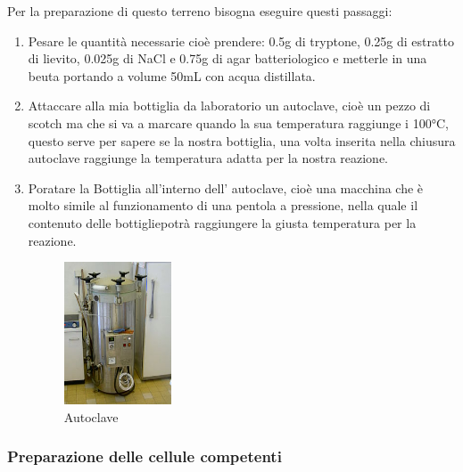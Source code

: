 Per la preparazione di questo terreno bisogna eseguire questi passaggi:

\begin{enumerate}

	\item Pesare le quantità necessarie cioè prendere: 0.5g di tryptone, 0.25g di estratto di lievito, 0.025g di NaCl e 0.75g di agar batteriologico e metterle in una beuta portando a volume 50mL con acqua distillata.
  \item Attaccare alla mia bottiglia da laboratorio un autoclave, cioè un pezzo di scotch ma che si va a marcare quando la sua temperatura raggiunge i 100°C, questo serve per sapere se la nostra bottiglia, una volta inserita nella chiusura autoclave raggiunge la temperatura adatta per la nostra reazione.

	\item Poratare la Bottiglia all'interno dell' autoclave, cioè una macchina che è molto simile al funzionamento di una pentola a pressione, nella quale il contenuto delle bottigliepotrà raggiungere la giusta temperatura per la reazione.

  \begin{figure}[H]
		\centering
		\includegraphics[width=0.3\textwidth]{./immagini/autoclave.JPG}
		\caption{Autoclave}
		\label{autoclave}

	\end{figure}


\end{enumerate}



\subsubsection{Preparazione delle cellule competenti}


